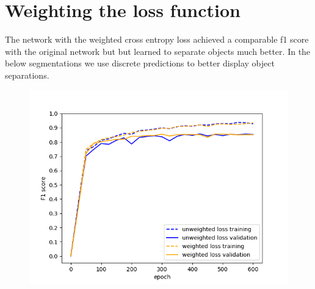 \documentclass{kththesis}
\begin{document}
\section{Weighting the loss function}
The network with the weighted cross entropy loss achieved a comparable f1 score with the original network but but learned to separate objects much better. In the below segmentations we use discrete predictions to better display object separations.
\begin{center}
\begin{figure}[H]
      \includegraphics[scale=0.7]{weighted_vs_unweighted}
  \caption{} \label{fig:weighted_vs_unweighted}
\end{figure}
\end{center}
\end{document}
